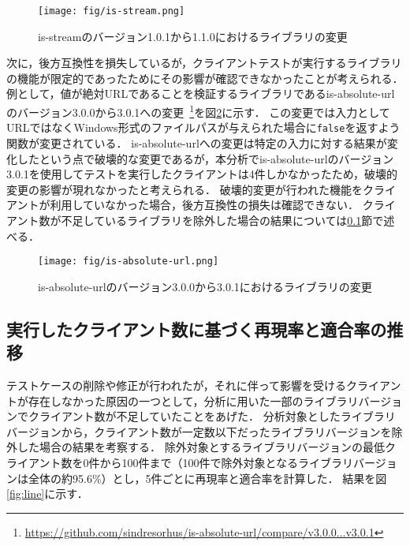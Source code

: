 \documentclass[submit]{ipsj}
\begin{document}
\begin{figure}
  \vspace{1zh}
  \centering
  \texttt{[image: fig/is-stream.png]}
  \caption{is-streamのバージョン1.0.1から1.1.0におけるライブラリの変更}
  \label{fig:isStream}
\end{figure}

次に，後方互換性を損失しているが，クライアントテストが実行するライブラリの機能が限定的であったためにその影響が確認できなかったことが考えられる．
例として，値が絶対URLであることを検証するライブラリであるis-absolute-urlのバージョン3.0.0から3.0.1への変更~\footnote{\url{https://github.com/sindresorhus/is-absolute-url/compare/v3.0.0...v3.0.1}}を図\ref{fig:isAbsoluteUrl}に示す．
この変更では入力としてURLではなくWindows形式のファイルパスが与えられた場合に{\verb|false|}を返すよう関数が変更されている．
is-absolute-urlへの変更は特定の入力に対する結果が変化したという点で破壊的な変更であるが，本分析でis-absolute-urlのバージョン3.0.1を使用してテストを実行したクライアントは4件しかなかったため，破壊的変更の影響が現れなかったと考えられる．
破壊的変更が行われた機能をクライアントが利用していなかった場合，後方互換性の損失は確認できない．
クライアント数が不足しているライブラリを除外した場合の結果については\ref{sec:line}節で述べる．

\begin{figure}
  \vspace{1zh}
  \centering
  \texttt{[image: fig/is-absolute-url.png]}
  \caption{is-absolute-urlのバージョン3.0.0から3.0.1におけるライブラリの変更}
  \label{fig:isAbsoluteUrl}
\end{figure}

\subsection{実行したクライアント数に基づく再現率と適合率の推移}
\label{sec:line}

テストケースの削除や修正が行われたが，それに伴って影響を受けるクライアントが存在しなかった原因の一つとして，分析に用いた一部のライブラリバージョンでクライアント数が不足していたことをあげた．
分析対象としたライブラリバージョンから，クライアント数が一定数以下だったライブラリバージョンを除外した場合の結果を考察する．
除外対象とするライブラリバージョンの最低クライアント数を0件から100件まで（100件で除外対象となるライブラリバージョンは全体の約95.6\%）とし，5件ごとに再現率と適合率を計算した．
結果を図\ref{fig:line}に示す．
\end{document}
